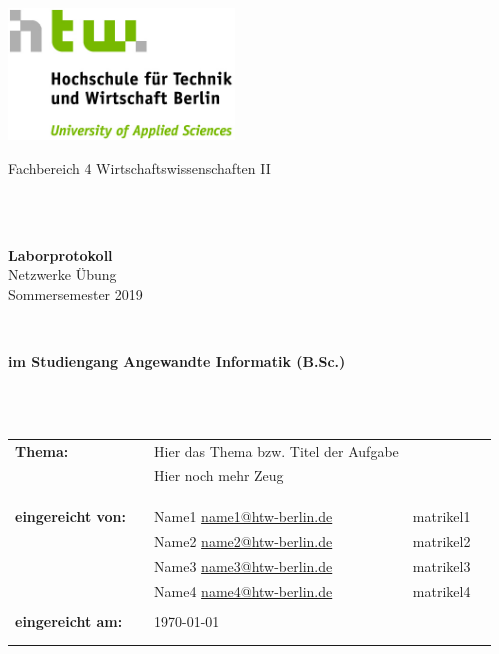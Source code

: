 \documentclass[paper=a4,fontsize=11pt]{scrartcl}%
\numberwithin{equation}{section}
\begin{document}


\begin{titlepage}
\thispagestyle{empty}
\begin{center}
\includegraphics[width=0.45\textwidth]{HTW_Logo_rgb}\\
\end{center}
 
 
\begin{center}
\Large{Fachbereich 4 Wirtschaftswissenschaften II}
\end{center}
\begin{verbatim}
 
 
\end{verbatim}
\begin{center}
\textbf{\LARGE{Laborprotokoll}}\\
Netzwerke Übung\\
Sommersemester 2019
\end{center}
\begin{verbatim}
 

\end{verbatim}
\begin{center}
\textbf{im Studiengang Angewandte Informatik (B.Sc.)}
\end{center}
\begin{verbatim}
 
 
\end{verbatim}
 
\begin{flushleft}
\begin{tabular}{lllll}
\textbf{Thema:} & & Hier das Thema bzw. Titel der Aufgabe \\
& & Hier noch mehr Zeug\\
& & \\
& & \\
& & \\
\textbf{eingereicht von:}
& & Name1 \href{mailto: name1@htw-berlin.de}{name1@htw-berlin.de} & matrikel1\\
& & Name2 \href{mailto: name2@htw-berlin.de}{name2@htw-berlin.de} & matrikel2\\
& & Name3 \href{mailto: name3@htw-berlin.de}{name3@htw-berlin.de} & matrikel3\\
& & Name4 \href{mailto: name4@htw-berlin.de}{name4@htw-berlin.de} & matrikel4\\
\\
\textbf{eingereicht am:} & & \today\\
& & \\
& & \\
\end{tabular}
\end{flushleft}
\end{titlepage}
\end{document}
